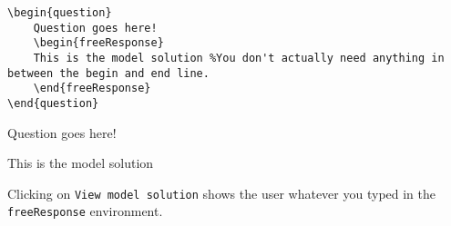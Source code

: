 \documentclass{ximera}
\begin{document}
\begin{verbatim}
\begin{question}
	Question goes here!
	\begin{freeResponse}
	This is the model solution %You don't actually need anything in between the begin and end line.
	\end{freeResponse} 
\end{question}
\end{verbatim}

\begin{question}
	Question goes here!
	\begin{freeResponse}
	This is the model solution %
	\end{freeResponse} 
\end{question}

\begin{remark}
Clicking on \verb!View model solution! shows the user
whatever you typed in the  \verb!freeResponse! environment.
\end{remark}
\end{document}
